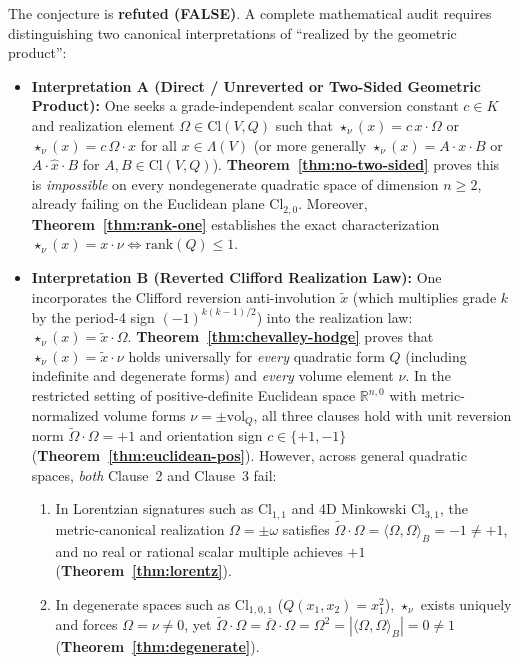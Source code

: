 \documentclass[11pt]{article}
\theoremstyle{definition}
\newcommand{\Cl}{\mathrm{Cl}}
\newcommand{\vol}{\mathrm{vol}}
\newcommand{\rk}{\mathrm{rank}}
\begin{document}
The conjecture is \textbf{refuted (FALSE)}. A complete mathematical audit requires distinguishing two canonical interpretations of ``realized by the geometric product'':
\begin{itemize}
  \item \textbf{Interpretation A (Direct / Unreverted or Two-Sided Geometric Product):} One seeks a grade-independent scalar conversion constant $c \in K$ and realization element $\Omega \in \Cl(V,Q)$ such that $\star_\nu(x) = c\,x\cdot\Omega$ or $\star_\nu(x) = c\,\Omega\cdot x$ for all $x \in \Lambda(V)$ (or more generally $\star_\nu(x) = A\cdot x\cdot B$ or $A\cdot\hat{x}\cdot B$ for $A,B \in \Cl(V,Q)$). \textbf{Theorem~\ref{thm:no-two-sided}} proves this is \emph{impossible} on every nondegenerate quadratic space of dimension $n \ge 2$, already failing on the Euclidean plane $\Cl_{2,0}$. Moreover, \textbf{Theorem~\ref{thm:rank-one}} establishes the exact characterization $\star_\nu(x) = x\cdot\nu \iff \rk(Q) \le 1$.
  \item \textbf{Interpretation B (Reverted Clifford Realization Law):} One incorporates the Clifford reversion anti-involution $\widetilde{x}$ (which multiplies grade $k$ by the period-4 sign $(-1)^{k(k-1)/2}$) into the realization law: $\star_\nu(x) = \widetilde{x}\cdot\Omega$. \textbf{Theorem~\ref{thm:chevalley-hodge}} proves that $\star_\nu(x) = \widetilde{x}\cdot\nu$ holds universally for \emph{every} quadratic form $Q$ (including indefinite and degenerate forms) and \emph{every} volume element $\nu$. In the restricted setting of positive-definite Euclidean space $\mathbb{R}^{n,0}$ with metric-normalized volume forms $\nu = \pm\vol_Q$, all three clauses hold with unit reversion norm $\widetilde{\Omega}\cdot\Omega = +1$ and orientation sign $c \in \{+1,-1\}$ (\textbf{Theorem~\ref{thm:euclidean-pos}}). However, across general quadratic spaces, \emph{both} Clause~2 and Clause~3 fail:
  \begin{enumerate}
    \item[(a)] In Lorentzian signatures such as $\Cl_{1,1}$ and 4D Minkowski $\Cl_{3,1}$, the metric-canonical realization $\Omega = \pm\omega$ satisfies $\widetilde{\Omega}\cdot\Omega = \langle\Omega,\Omega\rangle_B = -1 \neq +1$, and no real or rational scalar multiple achieves $+1$ (\textbf{Theorem~\ref{thm:lorentz}}).
    \item[(b)] In degenerate spaces such as $\Cl_{1,0,1}$ ($Q(x_1,x_2) = x_1^2$), $\star_\nu$ exists uniquely and forces $\Omega = \nu \neq 0$, yet $\widetilde{\Omega}\cdot\Omega = \overline{\Omega}\cdot\Omega = \Omega^2 = |\langle\Omega,\Omega\rangle_B| = 0 \neq 1$ (\textbf{Theorem~\ref{thm:degenerate}}).

\end{enumerate}
\end{itemize}
\end{document}
